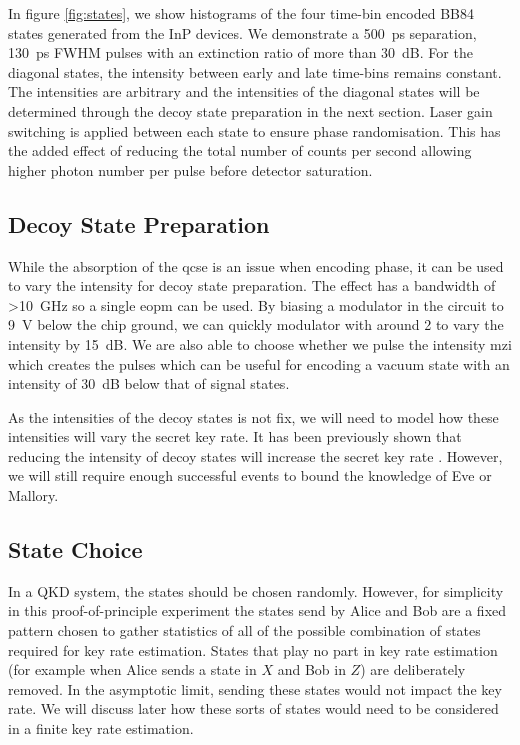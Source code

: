 In figure \ref{fig:states}, we show histograms of the four time-bin encoded BB84 states generated from the \ac{InP} devices. We demonstrate a \SI{500}{ps} separation, \SI{130}{ps} \ac{FWHM} pulses with an extinction ratio of more than \SI{30}{dB}. For the diagonal states, the intensity between early and late time-bins remains constant. The intensities are arbitrary and the intensities of the diagonal states will be determined through the decoy state preparation in the next section. Laser gain switching is applied between each state to ensure phase randomisation. This has the added effect of reducing the total number of counts per second allowing higher photon number per pulse before detector saturation.

\subsection{Decoy State Preparation}

While the absorption of the \ac{qcse} is an issue when encoding phase, it can be used to vary the intensity for decoy state preparation. The effect has a bandwidth of \SI{>10}{\GHz} so a single \ac{eopm} can be used. By biasing a modulator in the circuit to \SI{9}{\V} below the chip ground, we can quickly modulator with around \SI{2}{\Vpp} to vary the intensity by \SI{15}{dB}. We are also able to choose whether we pulse the intensity \ac{mzi} which creates the pulses which can be useful for encoding a vacuum state with an intensity of \SI{30}{dB} below that of signal states.

As the intensities of the decoy states is not fix, we will need to model how these intensities will vary the secret key rate. It has been previously shown that reducing the intensity of decoy states will increase the secret key rate \cite{Chan2014}. However, we will still require enough successful events to bound the knowledge of Eve or Mallory.

\subsection{State Choice}

In a \ac{QKD} system, the states should be chosen randomly. However, for simplicity in this proof-of-principle experiment the states send by Alice and Bob are a fixed pattern chosen to gather statistics of all of the possible combination of states required for key rate estimation. States that play no part in key rate estimation (for example when Alice sends a state in $X$ and Bob in $Z$) are deliberately removed. In the asymptotic limit, sending these states would not impact the key rate. We will discuss later how these sorts of states would need to be considered in a finite key rate estimation.

